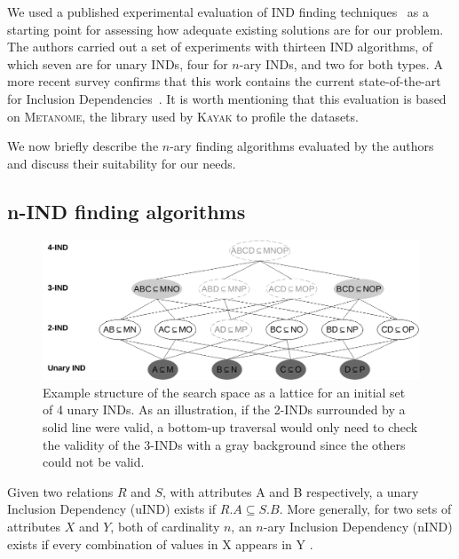 We used a published experimental evaluation of \gls{IND} finding techniques~\cite{Dursch2019}
as a starting point for
assessing how adequate existing solutions are for our problem. The authors carried out a
set of experiments with thirteen \gls{IND} algorithms, of which seven are for unary \glspl{IND},
four for $n$-ary \glspl{IND}, and two for both types. A more recent survey confirms that this
work contains the current state-of-the-art for Inclusion
Dependencies~\cite{kossmann_data_2022}. It is worth mentioning that this evaluation is based on
\textsc{Metanome}, the library used by \textsc{Kayak} to profile the datasets.

We now briefly describe the $n$-ary finding
algorithms evaluated by the authors and discuss their suitability for our needs.

\subsection{n-IND finding algorithms}
\label{sec:nind_finding}
\begin{figure}[ht]
    \centering
    \includegraphics[width=\linewidth]{images/5_presq/lattice}
    \caption[Example structure of the search space as a lattice for an initial set
        of 4 unary Inclusion Dependencies.]{
        Example structure of the search space as a lattice for an initial set
        of 4 unary \glspl{IND}.
        As an illustration, if the 2-INDs surrounded by a solid line were valid,
        a bottom-up traversal would only need to check the validity of the 3-INDs with a 
        gray background since the others could not be valid.
    }
    \label{fig:lattice}
\end{figure}

Given two relations $R$ and $S$, with attributes A and B respectively,
a unary Inclusion Dependency (uIND) exists if $R.A \subseteq S.B$.
More generally, for two sets of attributes $X$ and $Y$, both of cardinality $n$, an
$n$-ary Inclusion Dependency (nIND) exists if every combination of values in X appears in Y
\cite{DeMarchi2002,abedjan2015}.

